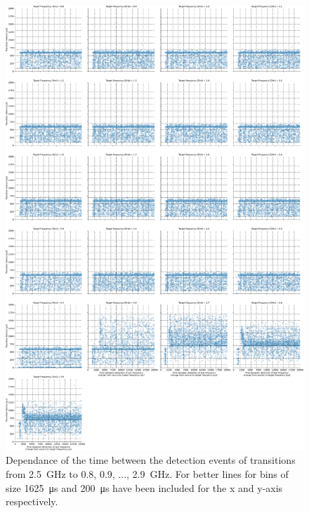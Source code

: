 \begin{figure}[]
    \centering
    \includegraphics[width=\columnwidth]{fig/ftalat_scatter_wait_transition_latency_hati_source_2.5.pdf}
    \caption{Dependance of the time between the detection events of transitions from \SI{2.5}{\GHz} to \SI{0.8}{}, \SI{0.9}{}, ..., \SI{2.9}{\GHz}. For better lines for bins of size \SI{1625}{\us} and \SI{200}{\us} have been included for the x and y-axis respectively.}
\end{figure}
